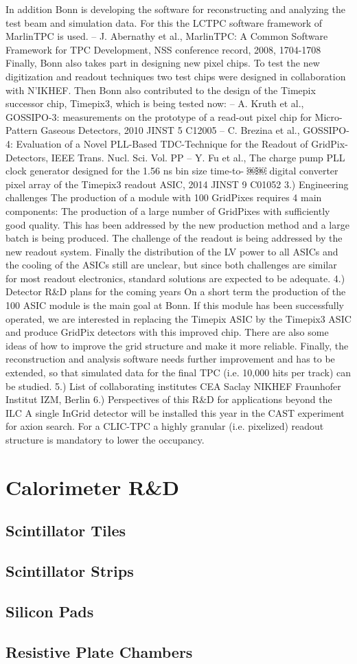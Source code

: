 \documentclass[11pt]{article}
\begin{document}
In addition Bonn is developing the software for reconstructing and analyzing the test beam and simulation data. For this the LCTPC software framework of MarlinTPC is used.
– J. Abernathy et al., MarlinTPC: A Common Software Framework for TPC Development, NSS conference record, 2008, 1704-1708
Finally, Bonn also takes part in designing new pixel chips. To test the new digitization and readout techniques two test chips were designed in collaboration with N'IKHEF. Then Bonn also contributed to the design of the Timepix successor chip, Timepix3, which is being tested now:
– A. Kruth et al., GOSSIPO-3: measurements on the prototype of a read-out pixel chip for Micro- Pattern Gaseous Detectors, 2010 JINST 5 C12005
– C. Brezina et al., GOSSIPO-4: Evaluation of a Novel PLL-Based TDC-Technique for the Readout of GridPix-Detectors, IEEE Trans. Nucl. Sci. Vol. PP
– Y. Fu et al., The charge pump PLL clock generator designed for the 1.56 ns bin size time-to-
￼￼
digital converter pixel array of the Timepix3 readout ASIC, 2014 JINST 9 C01052
3.) Engineering challenges
The production of a module with 100 GridPixes requires 4 main components: The production of a
large number of GridPixes with sufficiently good quality. This has been addressed by the new production method and a large batch is being produced. The challenge of the readout is being addressed by the new readout system. Finally the distribution of the LV power to all ASICs and the cooling of the ASICs still are unclear, but since both challenges are similar for most readout electronics, standard solutions are expected to be adequate.
4.) Detector R&D plans for the coming years
On a short term the production of the 100 ASIC module is the main goal at Bonn. If this module has been successfully operated, we are interested in replacing the Timepix ASIC by the Timepix3 ASIC and produce GridPix detectors with this improved chip. There are also some ideas of how to improve the grid structure and make it more reliable. Finally, the reconstruction and analysis software needs further improvement and has to be extended, so that simulated data for the final TPC (i.e. 10,000 hits per track) can be studied.
5.) List of collaborating institutes CEA Saclay
NIKHEF
Fraunhofer Institut IZM, Berlin
6.) Perspectives of this R&D for applications beyond the ILC
A single InGrid detector will be installed this year in the CAST experiment for axion search. For a CLIC-TPC a highly granular (i.e. pixelized) readout structure is mandatory to lower the occupancy.
\section{Calorimeter R\&D}
\subsection{Scintillator Tiles}
\subsection{Scintillator Strips}
\subsection{Silicon Pads}
\subsection{Resistive Plate Chambers}
\end{document}
